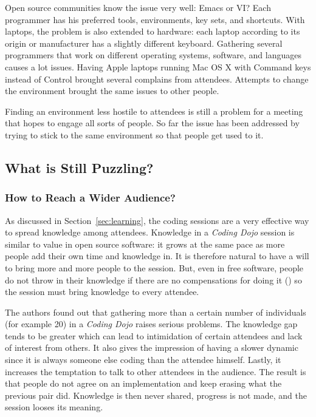Open source communities know the issue very well: Emacs or VI? Each programmer
has his preferred tools, environments, key sets, and
shortcuts. With laptops, the problem is also extended to hardware:
each laptop according to its origin or manufacturer has a slightly
different keyboard. Gathering several programmers that work on
different operating systems, software, and languages causes a lot
issues. Having Apple laptops running Mac OS X with Command keys
instead of Control brought several complains from attendees. Attempts
to change the environment brought the same issues to other people.

Finding an environment less hostile to attendees is still a problem
for a meeting that hopes to engage all sorts of people. So far the
issue has been addressed by trying to stick to the same environment so
that people get used to it.

\subsection{What is Still Puzzling?}\label{ssub:puzzles}


\subsubsection{How to Reach a Wider Audience?}

As discussed in Section~\ref{sec:learning}, the coding sessions
are a very effective way to spread knowledge among attendees. Knowledge in a
\emph{Coding Dojo} session is similar to value in open source
software: it grows at the same pace as more people add their own time
and knowledge in. It is therefore natural to have a will to bring more
and more people to the session. But, even in free software, people do not
throw in their knowledge if there are no compensations for doing it
(\cite{RishabGhosh}) so the session must bring knowledge to every
attendee.

The authors found out that gathering more than a certain number of
individuals (for example 20) in a \emph{Coding Dojo} raises serious
problems. The knowledge gap tends to be greater which can lead to
intimidation of certain attendees and lack of interest from others. It
also gives the impression of having a slower dynamic since it is
always someone else coding than the attendee himself. Lastly, it
increases the temptation to talk to other attendees in the
audience. The result is that people do not agree on an implementation
and keep erasing what the previous pair did. Knowledge is then never
shared, progress is not made, and the session looses its meaning.


